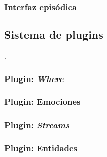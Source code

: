 \subsubsection{Interfaz episódica}

\subsection{Sistema de plugins}
.

\subsubsection{Plugin: \textit{Where}}


\subsubsection{Plugin: Emociones}



\subsubsection{Plugin: \textit{Streams}}



\subsubsection{Plugin: Entidades}


